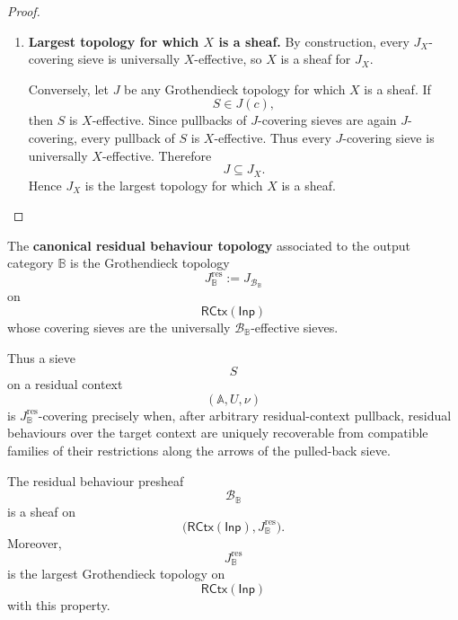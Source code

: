 \begin{proof}
\begin{enumerate}
        The transitivity pasting is summarized by
        \[
        \begin{tikzcd}[column sep=large, row sep=large]
            f^*R
                \arrow[r, hook]
                \arrow[d, hook]
            &
            y(d)
                \arrow[d, "y(f)"]
            \\
            R
                \arrow[r, hook]
            &
            y(c)
            &
            S
                \arrow[l, hook']
        \end{tikzcd}
        \]
        for each \(f\in S\).

        \item \textbf{Largest topology for which \(X\) is a sheaf.}
        By construction, every \(J_X\)-covering sieve is universally
        \(X\)-effective, so \(X\) is a sheaf for \(J_X\).

        Conversely, let \(J\) be any Grothendieck topology for which \(X\) is a
        sheaf. If
        \[
            S\in J(c),
        \]
        then \(S\) is \(X\)-effective. Since pullbacks of \(J\)-covering
        sieves are again \(J\)-covering, every pullback of \(S\) is
        \(X\)-effective. Thus every \(J\)-covering sieve is universally
        \(X\)-effective. Therefore
        \[
            J\subseteq J_X.
        \]
        Hence \(J_X\) is the largest topology for which \(X\) is a sheaf.
    \end{enumerate}
\end{proof}

\begin{definition}
\label{def:canonical-residual-behaviour-topology}
    The \textbf{canonical residual behaviour topology} associated to the output
    category \(\mathbb B\) is the Grothendieck topology
    \[
        J_{\mathbb B}^{\mathrm{res}}
        :=
        J_{\mathcal B_{\mathbb B}}
    \]
    on
    \[
        \mathsf{RCtx}(\mathsf{Inp})
    \]
    whose covering sieves are the universally
    \(\mathcal B_{\mathbb B}\)-effective sieves.
\end{definition}

Thus a sieve
\[
    S
\]
on a residual context
\[
    (\mathbb A,U,\nu)
\]
is \(J_{\mathbb B}^{\mathrm{res}}\)-covering precisely when, after arbitrary
residual-context pullback, residual behaviours over the target context are
uniquely recoverable from compatible families of their restrictions along the
arrows of the pulled-back sieve.

\begin{corollary}
\label{cor:residual-behaviours-form-sheaf}
    The residual behaviour presheaf
    \[
        \mathcal B_{\mathbb B}
    \]
    is a sheaf on
    \[
        \bigl(\mathsf{RCtx}(\mathsf{Inp}),J_{\mathbb B}^{\mathrm{res}}\bigr).
    \]
    Moreover,
    \[
        J_{\mathbb B}^{\mathrm{res}}
    \]
    is the largest Grothendieck topology on
    \[
        \mathsf{RCtx}(\mathsf{Inp})
    \]
    with this property.
\end{corollary}

